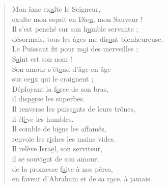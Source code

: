 
\begin{verse}
Mon âme ex\underline{a}lte le Seigneur,\\
exulte mon esprit en Die\underline{u}, mon Sauveur !\\

Il s'est penché sur son h\underline{u}mble servante ;\\
désormais, tous les âges me dir\underline{o}nt bienheureuse.\\

Le Puissant fit pour m\underline{o}i des merveilles ;\\
S\underline{a}int est son nom !\\

Son amour s'ét\underline{e}nd d'âge en âge\\
sur ce\underline{u}x qui le craignent ;\\

Déployant la f\underline{o}rce de son bras,\\
il disp\underline{e}rse les superbes.\\

Il renverse les puiss\underline{a}nts de leurs trônes,\\
il él\underline{è}ve les humbles.\\

Il comble de bi\underline{e}ns les affamés,\\
renvoie les r\underline{i}ches les mains vides.\\

Il relève Isra\underline{ë}l, son serviteur,\\
il se souvi\underline{e}nt de son amour,\\

de la promesse f\underline{a}ite à nos pères,\\
en faveur d'Abraham et de sa r\underline{a}ce, à jamais.
\end{verse}
